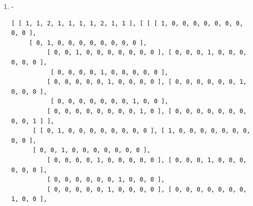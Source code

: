 \documentclass[a4paper, 10pt]{book}
\theoremstyle{definition}
\numberwithin{equation}{chapter}
\begin{document}
\begin{appendices}
\begin{enumerate}
\begin{lstlisting}[numbers=none]
          [ 0, 0, 0, 1, 0, 0, 0, 0, 0, 0 ] ], [ [ 0, 0, 0, 0, 0, 0, 1, 0, 0, 0 ], 
          [ 0, 0, 0, 0, 0, 1, 0, 0, 0, 0 ], 
          [ 0, 0, 0, 0, 0, 0, 0, 1, 0, 0 ], [ 0, 0, 0, 0, 0, 0, 0, 0, 1, 0 ], 
          [ 0, 0, 0, 0, 0, 0, 0, 0, 0, 1 ], 
          [ 0, 1, 0, 0, 0, 0, 0, 0, 0, 0 ], [ 1, 0, 0, 0, 0, 0, 0, 0, 0, 0 ], 
          [ 0, 0, 1, 0, 0, 0, 0, 0, 0, 0 ], 
          [ 0, 0, 0, 1, 0, 0, 0, 0, 0, 0 ], [ 0, 0, 0, 0, 1, 0, 0, 0, 0, 0 ] ], 
      [ [ 0, 0, 0, 0, 0, 0, 0, 1, 0, 0 ], [ 0, 0, 0, 0, 0, 0, 0, 1, 0, 0 ], 
      [ 1, 1, 0, 1, 1, 0, 0, 0, 0, 0 ], 
          [ 0, 0, 0, 0, 0, 0, 0, 1, 0, 0 ], [ 0, 0, 0, 0, 0, 0, 0, 1, 0, 0 ], 
          [ 0, 0, 1, 0, 0, 0, 0, 0, 0, 0 ], 
          [ 0, 0, 1, 0, 0, 0, 0, 0, 0, 0 ], [ 0, 0, 0, 0, 0, 1, 1, 0, 1, 1 ], 
          [ 0, 0, 1, 0, 0, 0, 0, 0, 0, 0 ], 
          [ 0, 0, 1, 0, 0, 0, 0, 0, 0, 0 ] ], [ [ 0, 0, 0, 0, 0, 0, 0, 0, 1, 0 ], 
          [ 0, 0, 0, 0, 0, 0, 0, 0, 0, 1 ], 
          [ 0, 0, 0, 0, 0, 0, 0, 1, 0, 0 ], [ 0, 0, 0, 0, 0, 0, 1, 0, 0, 0 ], 
          [ 0, 0, 0, 0, 0, 1, 0, 0, 0, 0 ], 
          [ 0, 0, 0, 0, 1, 0, 0, 0, 0, 0 ], [ 0, 0, 0, 1, 0, 0, 0, 0, 0, 0 ], 
          [ 0, 0, 1, 0, 0, 0, 0, 0, 0, 0 ], 
          [ 1, 0, 0, 0, 0, 0, 0, 0, 0, 0 ], [ 0, 1, 0, 0, 0, 0, 0, 0, 0, 0 ] ], 
      [ [ 0, 0, 0, 0, 0, 0, 0, 0, 0, 1 ], [ 0, 0, 0, 0, 0, 0, 0, 0, 1, 0 ], 
      [ 0, 0, 0, 0, 0, 0, 0, 1, 0, 0 ], 
          [ 0, 0, 0, 0, 0, 1, 0, 0, 0, 0 ], [ 0, 0, 0, 0, 0, 0, 1, 0, 0, 0 ], 
          [ 0, 0, 0, 1, 0, 0, 0, 0, 0, 0 ], 
          [ 0, 0, 0, 0, 1, 0, 0, 0, 0, 0 ], [ 0, 0, 1, 0, 0, 0, 0, 0, 0, 0 ], 
          [ 0, 1, 0, 0, 0, 0, 0, 0, 0, 0 ], 
          [ 1, 0, 0, 0, 0, 0, 0, 0, 0, 0 ] ] ] ]
	\end{lstlisting}
	\item -
	\begin{lstlisting}[numbers=none]
	[ [ 1, 1, 2, 1, 1, 1, 1, 2, 1, 1 ], [ [ [ 1, 0, 0, 0, 0, 0, 0, 0, 0, 0 ],
	 [ 0, 1, 0, 0, 0, 0, 0, 0, 0, 0 ], 
          [ 0, 0, 1, 0, 0, 0, 0, 0, 0, 0 ], [ 0, 0, 0, 1, 0, 0, 0, 0, 0, 0 ],
           [ 0, 0, 0, 0, 1, 0, 0, 0, 0, 0 ], 
          [ 0, 0, 0, 0, 0, 1, 0, 0, 0, 0 ], [ 0, 0, 0, 0, 0, 0, 1, 0, 0, 0 ],
           [ 0, 0, 0, 0, 0, 0, 0, 1, 0, 0 ], 
          [ 0, 0, 0, 0, 0, 0, 0, 0, 1, 0 ], [ 0, 0, 0, 0, 0, 0, 0, 0, 0, 1 ] ], 
      [ [ 0, 1, 0, 0, 0, 0, 0, 0, 0, 0 ], [ 1, 0, 0, 0, 0, 0, 0, 0, 0, 0 ], 
      [ 0, 0, 1, 0, 0, 0, 0, 0, 0, 0 ], 
          [ 0, 0, 0, 0, 1, 0, 0, 0, 0, 0 ], [ 0, 0, 0, 1, 0, 0, 0, 0, 0, 0 ], 
          [ 0, 0, 0, 0, 0, 0, 1, 0, 0, 0 ], 
          [ 0, 0, 0, 0, 0, 1, 0, 0, 0, 0 ], [ 0, 0, 0, 0, 0, 0, 0, 1, 0, 0 ], 

\end{lstlisting}
\end{enumerate}
\end{appendices}
\end{document}
